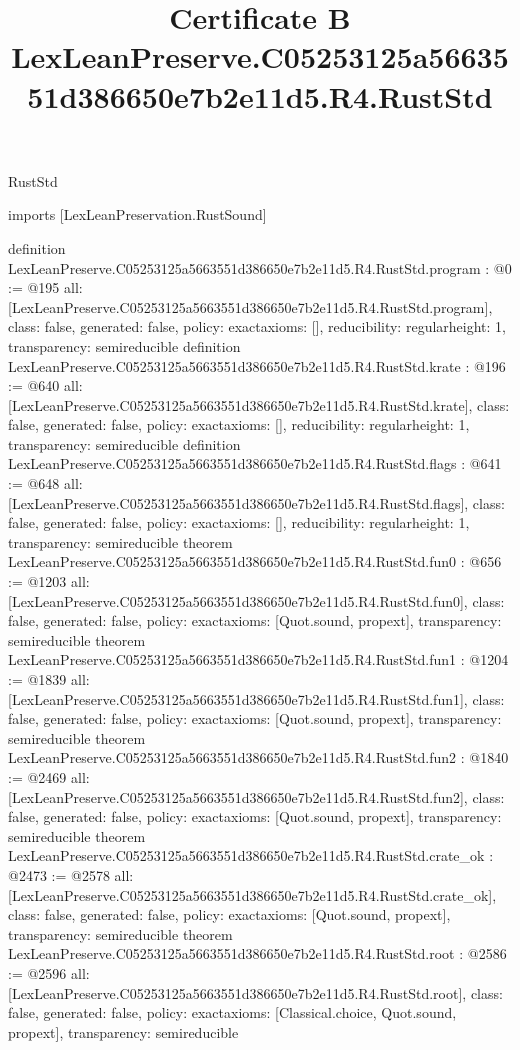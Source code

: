 \begin{lexlean}{RustStd}
\title{Certificate B LexLeanPreserve.C05253125a5663551d386650e7b2e11d5.R4.RustStd}
\begin{coremodule}
imports [LexLeanPreservation.RustSound]

definition LexLeanPreserve.C05253125a5663551d386650e7b2e11d5.R4.RustStd.program : @0 := @195 {
  all: [LexLeanPreserve.C05253125a5663551d386650e7b2e11d5.R4.RustStd.program],
  class: false,
  generated: false,
  policy: exact{axioms: []},
  reducibility: regular{height: 1},
  transparency: semireducible
}
definition LexLeanPreserve.C05253125a5663551d386650e7b2e11d5.R4.RustStd.krate : @196 := @640 {
  all: [LexLeanPreserve.C05253125a5663551d386650e7b2e11d5.R4.RustStd.krate],
  class: false,
  generated: false,
  policy: exact{axioms: []},
  reducibility: regular{height: 1},
  transparency: semireducible
}
definition LexLeanPreserve.C05253125a5663551d386650e7b2e11d5.R4.RustStd.flags : @641 := @648 {
  all: [LexLeanPreserve.C05253125a5663551d386650e7b2e11d5.R4.RustStd.flags],
  class: false,
  generated: false,
  policy: exact{axioms: []},
  reducibility: regular{height: 1},
  transparency: semireducible
}
theorem LexLeanPreserve.C05253125a5663551d386650e7b2e11d5.R4.RustStd.fun0 : @656 := @1203 {
  all: [LexLeanPreserve.C05253125a5663551d386650e7b2e11d5.R4.RustStd.fun0],
  class: false,
  generated: false,
  policy: exact{axioms: [Quot.sound, propext]},
  transparency: semireducible
}
theorem LexLeanPreserve.C05253125a5663551d386650e7b2e11d5.R4.RustStd.fun1 : @1204 := @1839 {
  all: [LexLeanPreserve.C05253125a5663551d386650e7b2e11d5.R4.RustStd.fun1],
  class: false,
  generated: false,
  policy: exact{axioms: [Quot.sound, propext]},
  transparency: semireducible
}
theorem LexLeanPreserve.C05253125a5663551d386650e7b2e11d5.R4.RustStd.fun2 : @1840 := @2469 {
  all: [LexLeanPreserve.C05253125a5663551d386650e7b2e11d5.R4.RustStd.fun2],
  class: false,
  generated: false,
  policy: exact{axioms: [Quot.sound, propext]},
  transparency: semireducible
}
theorem LexLeanPreserve.C05253125a5663551d386650e7b2e11d5.R4.RustStd.crate_ok : @2473 := @2578 {
  all: [LexLeanPreserve.C05253125a5663551d386650e7b2e11d5.R4.RustStd.crate_ok],
  class: false,
  generated: false,
  policy: exact{axioms: [Quot.sound, propext]},
  transparency: semireducible
}
theorem LexLeanPreserve.C05253125a5663551d386650e7b2e11d5.R4.RustStd.root : @2586 := @2596 {
  all: [LexLeanPreserve.C05253125a5663551d386650e7b2e11d5.R4.RustStd.root],
  class: false,
  generated: false,
  policy: exact{axioms: [Classical.choice, Quot.sound, propext]},
  transparency: semireducible
}


\end{coremodule}
\end{lexlean}
